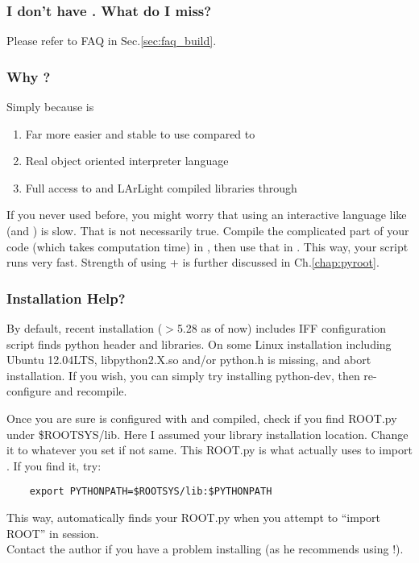 \subsubsection{I don't have \clang. What do I miss?}
Please refer to FAQ in Sec.\ref{sec:faq_build}.

\subsubsection{Why \PyROOT?}
Simply because \python is 
\begin{enumerate}
\item Far more easier and stable to use compared to \CINT
\item Real object oriented interpreter language
\item Full access to \ROOT and LArLight compiled libraries through \PyROOT
\end{enumerate}
If you never used \PyROOT before, you might worry that using an interactive language like \python (and \CINT) is slow.
That is not necessarily true. 
Compile the complicated part of your code (which takes computation time) in \CPP, then use that in \python. 
This way, your \python script runs very fast.
Strength of using \python + \PyROOT is further discussed in Ch.\ref{chap:pyroot}.

\subsubsection{\PyROOT Installation Help?}
\label{sec:pyroothelp}
By default, recent \ROOT installation ($>$5.28 as of now) includes \PyROOT IFF \ROOT configuration script finds python header and libraries. 
On some Linux installation including Ubuntu 12.04LTS, {\ttfamily libpython2.X.so} and/or {\ttfamily python.h} is missing, and \ROOT abort \PyROOT installation.
If you wish, you can simply try installing {\ttfamily python-dev}, then re-configure \ROOT and recompile. 

Once you are sure \ROOT is configured with \python and compiled, check if you find {\ttfamily ROOT.py} under {\ttfamily \$ROOTSYS/lib}. Here I assumed your \ROOT library installation location. Change it to whatever you set if not same. This {\ttfamily ROOT.py} is what \python actually uses to import \ROOT. If you find it, try:
\begin{lstlisting}
    export PYTHONPATH=$ROOTSYS/lib:$PYTHONPATH
\end{lstlisting}
This way, \python automatically finds your {\ttfamily ROOT.py} when you attempt to ``import ROOT'' in \python session.\\

Contact the author if you have a problem installing \PyROOT (as he recommends using \PyROOT!).








